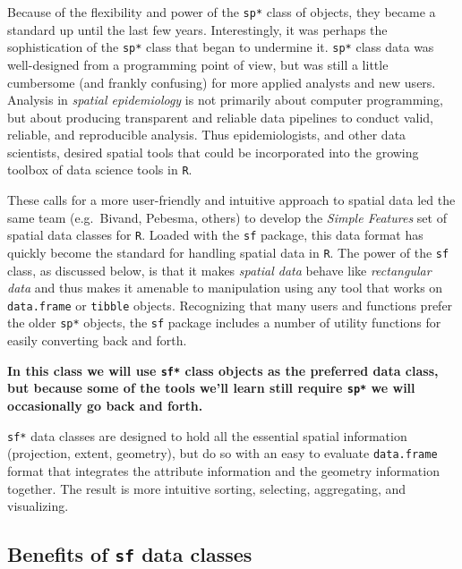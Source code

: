 \documentclass[
]{book}
\begin{document}
Because of the flexibility and power of the \texttt{sp*} class of objects, they became a standard up until the last few years. Interestingly, it was perhaps the sophistication of the \texttt{sp*} class that began to undermine it. \texttt{sp*} class data was well-designed from a programming point of view, but was still a little cumbersome (and frankly confusing) for more applied analysts and new users. Analysis in \emph{spatial epidemiology} is not primarily about computer programming, but about producing transparent and reliable data pipelines to conduct valid, reliable, and reproducible analysis. Thus epidemiologists, and other data scientists, desired spatial tools that could be incorporated into the growing toolbox of data science tools in \texttt{R}.

These calls for a more user-friendly and intuitive approach to spatial data led the same team (e.g.~Bivand, Pebesma, others) to develop the \emph{Simple Features} set of spatial data classes for \texttt{R}. Loaded with the \texttt{sf} package, this data format has quickly become the standard for handling spatial data in \texttt{R}. The power of the \texttt{sf} class, as discussed below, is that it makes \emph{spatial data} behave like \emph{rectangular data} and thus makes it amenable to manipulation using any tool that works on \texttt{data.frame} or \texttt{tibble} objects. Recognizing that many users and functions prefer the older \texttt{sp*} objects, the \texttt{sf} package includes a number of utility functions for easily converting back and forth.

\textbf{In this class we will use \texttt{sf*} class objects as the preferred data class, but because some of the tools we'll learn still require \texttt{sp*} we will occasionally go back and forth.}

\texttt{sf*} data classes are designed to hold all the essential spatial information (projection, extent, geometry), but do so with an easy to evaluate \texttt{data.frame} format that integrates the attribute information and the geometry information together. The result is more intuitive sorting, selecting, aggregating, and visualizing.

\hypertarget{benefits-of-sf-data-classes}{%
\subsection{\texorpdfstring{Benefits of \texttt{sf} data classes}{Benefits of sf data classes}}\label{benefits-of-sf-data-classes}}
\end{document}
